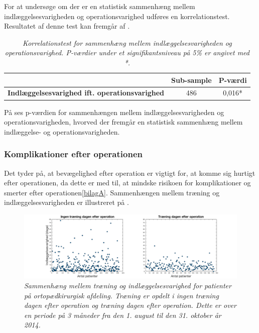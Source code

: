For at undersøge om der er en statistisk sammenhæng mellem indlæggelsesvarigheden og operationsvarighed udføres en korrelationstest. Resultatet af denne test kan fremgår af .

\begin{table}[H]
\centering
\begin{tabular}{|c|c|c|}
\hline
\textbf{}  & \textbf{Sub-sample} & \textbf{P-værdi} \\ \hline
\textbf{Indlæggelsesvarighed ift. operationsvarighed} & 486                 & 0,016*           \\ \hline
\end{tabular}
\caption{\textit{Korrelationstest for sammenhæng mellem indlæggelsesvarigheden og operationsvarighed. P-værdier under et signifikantsniveau på 5\% er angivet med *.}}
\label{opogindlaegtab}
\end{table}

\noindent
På  ses p-værdien for sammenhængen mellem indlæggelsesvarigheden og operationsvarigheden, hvorved der fremgår en statistisk sammenhæng mellem indlæggelse- og operationsvarigheden. 

\subsubsection{Komplikationer efter operationen}
Det tyder på, at bevægelighed efter operation er vigtigt for, at komme sig hurtigt efter operationen, da dette er med til, at mindske risikoen for komplikationer og smerter efter operationen\ref{bilagA}\cite{Nordjylland2014}. Sammenhængen mellem træning og indlæggelsesvarigheden er illustreret på . 

\begin{figure}[H]
	\centering
	\includegraphics[scale=0.35]{figures/traeningindlaeg.png}
	\caption{\textit{Sammenhæng mellem træning og indlæggelsesvarighed for patienter på ortopædkirurgisk afdeling. Træning er opdelt i ingen træning dagen efter operation og træning dagen efter operation. Dette er over en periode på 3 måneder fra den 1. august til den 31. oktober år 2014.}}
	\label{traeningindlaeg}
	\end{figure}

